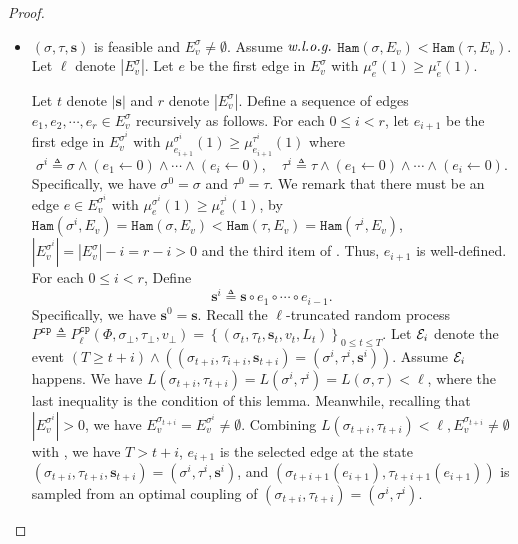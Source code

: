 \documentclass[11pt]{article}
\newcommand{\abs}[1]{\left\vert#1\right\vert}
\newcommand{\set}[1]{\left\{#1\right\}}
\def\!#1{\mathtt{#1}}
\newcommand{\seqS}{\boldsymbol{s}}
\begin{document}
\begin{proof}
\begin{itemize}
    \item $(\sigma,\tau,\seqS)$ is feasible and $E^{\sigma}_v \neq \emptyset$. 
    Assume $\emph{w.l.o.g.}$ ${\!{Ham}\left(\sigma, {E_{v}}\right)} < {\!{Ham}\left(\tau, {E_{v}}\right)}$.
    Let $\ell$ denote $\abs{E_v^\sigma}$. 
    Let $e$ be the first edge in $E_{v}^{\sigma}$ with $\mu^{\sigma}_e(1) \geq \mu^{\tau}_e(1)$.

    Let $t$ denote $\abs{\seqS}$ and $r$ denote $\abs{E^{\sigma}_v}$. 
    Define a sequence of edges $e_1,e_2,\cdots,e_r\in E^{\sigma}_v$ recursively as follows.
    For each $0\leq i<r$, let $e_{i+1}$ be the first edge in $E_{v}^{\sigma^{i}}$ with $\mu^{\sigma^{i}}_{e_{i+1}}(1) \geq \mu^{\tau^{i}}_{e_{i+1}}(1)$ where 
    \[\sigma^i \triangleq \sigma\land(e_1\leftarrow 0)\land \cdots\land (e_{i}\leftarrow 0), \quad \tau^i \triangleq \tau\land(e_1\leftarrow 0)\land \cdots\land (e_{i}\leftarrow 0).\]
    Specifically, we have $\sigma^0 = \sigma$ and $\tau^0 = \tau$.
    We remark that there must be an edge $e\in E_{v}^{\sigma^{i}}$ with $\mu^{\sigma^{i}}_{e}(1) \geq \mu^{\tau^{i}}_{e}(1)$, by 
    $\!{Ham}\left(\sigma^i, {E_v}\right) = \!{Ham}\left(\sigma, {E_v}\right) < \!{Ham}\left(\tau, {E_v}\right) = \!{Ham}\left(\tau^i, {E_v}\right)$,
    $\abs{E_{v}^{\sigma^{i}}} = \abs{E_{v}^{\sigma}} - i = r - i>0$ and the third item of . 
    Thus, $e_{i+1}$ is well-defined.
    For each $0\leq i<r$, Define 
    \[\seqS^i \triangleq \seqS\circ e_1\circ\cdots\circ e_{i-1}.\]
    Specifically, we have $\seqS^0 = \seqS$.
    Recall the $\ell$-truncated 
    random process $P^{\!{cp}} \triangleq P^{\!{cp}}_\ell(\Phi, \sigma_\bot, \tau_\bot, v_\bot) = \set{(\sigma_t, \tau_t, \seqS_t, v_t, L_t)}_{0\leq t \leq T}$.
    Let $\mathcal{E}_i$ denote the event $(T\geq t+i)\land \left((\sigma_{t+i},\tau_{i+i}, \seqS_{t+i})= (\sigma^i,\tau^i,\seqS^i)\right)$.
    Assume $\mathcal{E}_i$ happens.
    We have 
    $L(\sigma_{t+i},\tau_{t+i}) = L(\sigma^i,\tau^i) = L(\sigma,\tau)<\ell$, where the last inequality is the condition of this lemma.
    Meanwhile, recalling that $\abs{E_{v}^{\sigma^{i}}}>0$,
    we have $E_{v}^{\sigma_{t+i}} = E_{v}^{\sigma^{i}} \neq \emptyset$.
    Combining $L(\sigma_{t+i},\tau_{t+i})<\ell, E_{v}^{\sigma_{t+i}}  \neq \emptyset$ with  , 
    we have $T>t+i$,    
    $e_{i+1}$ is the selected edge at the state $(\sigma_{t+i},\tau_{t+i},\seqS_{t+i})= (\sigma^i,\tau^i,\seqS^i)$,
    and $(\sigma_{t+i+1}(e_{i+1}),\tau_{t+i+1}(e_{i+1}))$ is sampled from an optimal coupling of $(\sigma_{t+i},\tau_{t+i}) =(\sigma^i,\tau^i)$. 

\end{itemize}
\end{proof}
\end{document}
